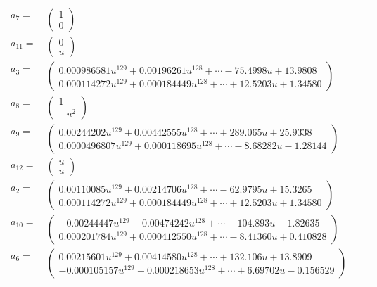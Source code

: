 \documentclass[1p]{elsarticle_modified}
\theoremstyle{definition}
\begin{document}
\begin{tabular}{m{7pt} m{180pt} m{7pt} m{180pt} }
\flushright $a_{7}=$&$\begin{pmatrix}1\\0\end{pmatrix}$ \\
\flushright $a_{11}=$&$\begin{pmatrix}0\\u\end{pmatrix}$ \\
\flushright $a_{3}=$&$\begin{pmatrix}0.000986581 u^{129}+0.00196261 u^{128}+\cdots-75.4998 u+13.9808\\0.000114272 u^{129}+0.000184449 u^{128}+\cdots+12.5203 u+1.34580\end{pmatrix}$ \\
\flushright $a_{8}=$&$\begin{pmatrix}1\\- u^2\end{pmatrix}$ \\
\flushright $a_{9}=$&$\begin{pmatrix}0.00244202 u^{129}+0.00442555 u^{128}+\cdots+289.065 u+25.9338\\0.0000496807 u^{129}+0.000118695 u^{128}+\cdots-8.68282 u-1.28144\end{pmatrix}$ \\
\flushright $a_{12}=$&$\begin{pmatrix}u\\u\end{pmatrix}$ \\
\flushright $a_{2}=$&$\begin{pmatrix}0.00110085 u^{129}+0.00214706 u^{128}+\cdots-62.9795 u+15.3265\\0.000114272 u^{129}+0.000184449 u^{128}+\cdots+12.5203 u+1.34580\end{pmatrix}$ \\
\flushright $a_{10}=$&$\begin{pmatrix}-0.00244447 u^{129}-0.00474242 u^{128}+\cdots-104.893 u-1.82635\\0.000201784 u^{129}+0.000412550 u^{128}+\cdots-8.41360 u+0.410828\end{pmatrix}$ \\
\flushright $a_{6}=$&$\begin{pmatrix}0.00215601 u^{129}+0.00414580 u^{128}+\cdots+132.106 u+13.8909\\-0.000105157 u^{129}-0.000218653 u^{128}+\cdots+6.69702 u-0.156529\end{pmatrix}$ \\

\end{tabular}
\end{document}
